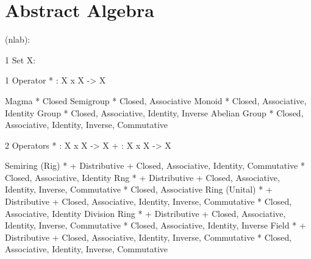 \part{Abstract Algebra}\label{part:abstract_algebra}

(nlab):


\iffalse

1 Set X:

  1 Operator
  * : X x X -> X

    Magma         * Closed
    Semigroup     * Closed, Associative
    Monoid        * Closed, Associative, Identity
    Group         * Closed, Associative, Identity, Inverse
    Abelian Group * Closed, Associative, Identity, Inverse, Commutative

  2 Operators
  * : X x X -> X
  + : X x X -> X

    Semiring (Rig) * + Distributive
                     + Closed, Associative, Identity, Commutative
                     * Closed, Associative, Identity
    Rng            * + Distributive
                     + Closed, Associative, Identity, Inverse, Commutative
                     * Closed, Associative
    Ring (Unital)  * + Distributive
                     + Closed, Associative, Identity, Inverse, Commutative
                     * Closed, Associative, Identity
    Division Ring  * + Distributive
                     + Closed, Associative, Identity, Inverse, Commutative
                     * Closed, Associative, Identity, Inverse
    Field          * + Distributive
                     + Closed, Associative, Identity, Inverse, Commutative
                     * Closed, Associative, Identity, Inverse, Commutative

